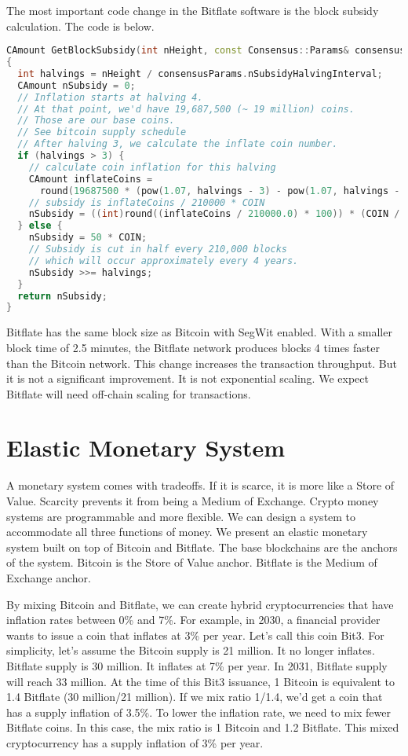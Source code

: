 \documentclass{article}      %
\begin{document}
The most important code change in the Bitflate software is the block subsidy calculation. The code is below.

\begin{lstlisting}[language=C++]
CAmount GetBlockSubsidy(int nHeight, const Consensus::Params& consensusParams)
{
  int halvings = nHeight / consensusParams.nSubsidyHalvingInterval;
  CAmount nSubsidy = 0;
  // Inflation starts at halving 4.
  // At that point, we'd have 19,687,500 (~ 19 million) coins.
  // Those are our base coins.
  // See bitcoin supply schedule
  // After halving 3, we calculate the inflate coin number.
  if (halvings > 3) {
    // calculate coin inflation for this halving
    CAmount inflateCoins =
      round(19687500 * (pow(1.07, halvings - 3) - pow(1.07, halvings - 4)));
    // subsidy is inflateCoins / 210000 * COIN
    nSubsidy = ((int)round((inflateCoins / 210000.0) * 100)) * (COIN / 100);
  } else {
    nSubsidy = 50 * COIN;
    // Subsidy is cut in half every 210,000 blocks
    // which will occur approximately every 4 years.
    nSubsidy >>= halvings;
  }
  return nSubsidy;
}
\end{lstlisting}

Bitflate has the same block size as Bitcoin with SegWit enabled. With a smaller block time of 2.5 minutes, the Bitflate network produces blocks 4 times faster than the Bitcoin network. This change increases the transaction throughput. But it is not a significant improvement. It is not exponential scaling. We expect Bitflate will need off-chain scaling for transactions.

\section{Elastic Monetary System}

A monetary system comes with tradeoffs. If it is scarce, it is more like a Store of Value. Scarcity prevents it from being a Medium of Exchange. Crypto money systems are programmable and more flexible. We can design a system to accommodate all three functions of money. We present an elastic monetary system built on top of Bitcoin and Bitflate. The base blockchains are the anchors of the system. Bitcoin is the Store of Value anchor. Bitflate is the Medium of Exchange anchor.

By mixing Bitcoin and Bitflate, we can create hybrid cryptocurrencies that have inflation rates between 0\% and 7\%. For example, in 2030, a financial provider wants to issue a coin that inflates at 3\% per year. Let's call this coin Bit3. For simplicity, let's assume the Bitcoin supply is 21 million. It no longer inflates. Bitflate supply is 30 million. It inflates at 7\% per year. In 2031, Bitflate supply will reach 33 million. At the time of this Bit3 issuance, 1 Bitcoin is equivalent to 1.4 Bitflate (30 million/21 million). If we mix ratio 1/1.4, we'd get a coin that has a supply inflation of 3.5\%. To lower the inflation rate, we need to mix fewer Bitflate coins. In this case, the mix ratio is 1 Bitcoin and 1.2 Bitflate. This mixed cryptocurrency has a supply inflation of 3\% per year.
\end{document}

